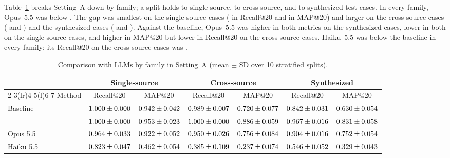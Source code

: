 Table~\ref{tab:llmkind} breaks Setting~A down by family; a split holds \NTestSingleMin{} to
\NTestSingleMax{} single-source, \NTestCrossMin{} to \NTestCrossMax{} cross-source, and
\NTestSynthMin{} to \NTestSynthMax{} synthesized test cases. In every family, Opus~5.5 was below
\ours{}. The gap was smallest on the single-source cases (\LeadRecSingle{} in
Recall@20 and \LeadMapTwSingle{} in MAP@20) and larger on the cross-source cases (\LeadRecCross{}
and \LeadMapTwCross) and the synthesized cases (\LeadRecSynth{} and \LeadMapTwSynth). Against the
baseline, Opus~5.5 was higher in both metrics
on the synthesized cases, lower in both on the single-source cases, and higher in MAP@20 but lower
in Recall@20 on the cross-source cases. Haiku~5.5 was below the baseline in every family; its
Recall@20 on the cross-source cases was \RecCrossHaiku.

\begin{table}[tbp]\centering
\caption{Comparison with LLMs by family in Setting~A (mean $\pm$ SD over 10 stratified splits).}
\label{tab:llmkind}
\scriptsize
\setlength{\tabcolsep}{2.5pt}
\begin{tabular}{lcccccc}
\toprule
 & \multicolumn{2}{c}{Single-source} & \multicolumn{2}{c}{Cross-source} & \multicolumn{2}{c}{Synthesized} \\
\cmidrule(lr){2-3}\cmidrule(lr){4-5}\cmidrule(l){6-7}
Method & Recall@20 & MAP@20 & Recall@20 & MAP@20 & Recall@20 & MAP@20 \\
\midrule
Baseline & $1.000 \pm 0.000$ & $0.942 \pm 0.042$ & $0.989 \pm 0.007$ & $0.720 \pm 0.077$ & $0.842 \pm 0.031$ & $0.630 \pm 0.054$ \\
\ours{} & $1.000 \pm 0.000$ & $0.953 \pm 0.023$ & $1.000 \pm 0.000$ & $0.886 \pm 0.059$ & $0.967 \pm 0.016$ & $0.831 \pm 0.058$ \\
Opus 5.5 & $0.964 \pm 0.033$ & $0.922 \pm 0.052$ & $0.950 \pm 0.026$ & $0.756 \pm 0.084$ & $0.904 \pm 0.016$ & $0.752 \pm 0.054$ \\
Haiku 5.5 & $0.823 \pm 0.047$ & $0.462 \pm 0.054$ & $0.385 \pm 0.109$ & $0.237 \pm 0.074$ & $0.546 \pm 0.052$ & $0.329 \pm 0.043$ \\
\bottomrule
\end{tabular}
\end{table}

